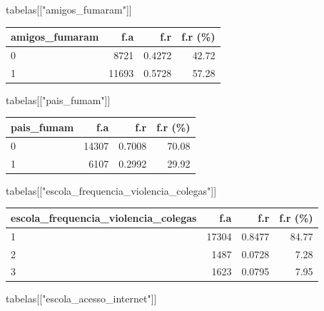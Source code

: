 \documentclass[
]{article}
\newenvironment{Shaded}{\begin{snugshade}}{\end{snugshade}}
\newcommand{\NormalTok}[1]{\textcolor[rgb]{0.00,0.23,0.31}{#1}}
\newcommand{\StringTok}[1]{\textcolor[rgb]{0.13,0.47,0.30}{#1}}
\begin{document}
\begin{Shaded}
\begin{Highlighting}[]
\NormalTok{tabelas[[}\StringTok{"amigos\_fumaram"}\NormalTok{]]}
\end{Highlighting}
\end{Shaded}

\begin{longtable}[]{@{}lrrr@{}}
\toprule()
amigos\_fumaram & f.a & f.r & f.r (\%) \\
\midrule()
\endhead
0 & 8721 & 0.4272 & 42.72 \\
1 & 11693 & 0.5728 & 57.28 \\
\bottomrule()
\end{longtable}

\begin{Shaded}
\begin{Highlighting}[]
\NormalTok{tabelas[[}\StringTok{"pais\_fumam"}\NormalTok{]]}
\end{Highlighting}
\end{Shaded}

\begin{longtable}[]{@{}lrrr@{}}
\toprule()
pais\_fumam & f.a & f.r & f.r (\%) \\
\midrule()
\endhead
0 & 14307 & 0.7008 & 70.08 \\
1 & 6107 & 0.2992 & 29.92 \\
\bottomrule()
\end{longtable}

\begin{Shaded}
\begin{Highlighting}[]
\NormalTok{tabelas[[}\StringTok{"escola\_frequencia\_violencia\_colegas"}\NormalTok{]]}
\end{Highlighting}
\end{Shaded}

\begin{longtable}[]{@{}lrrr@{}}
\toprule()
escola\_frequencia\_violencia\_colegas & f.a & f.r & f.r (\%) \\
\midrule()
\endhead
1 & 17304 & 0.8477 & 84.77 \\
2 & 1487 & 0.0728 & 7.28 \\
3 & 1623 & 0.0795 & 7.95 \\
\bottomrule()
\end{longtable}

\begin{Shaded}
\begin{Highlighting}[]
\NormalTok{tabelas[[}\StringTok{"escola\_acesso\_internet"}\NormalTok{]]}
\end{Highlighting}
\end{Shaded}
\end{document}
